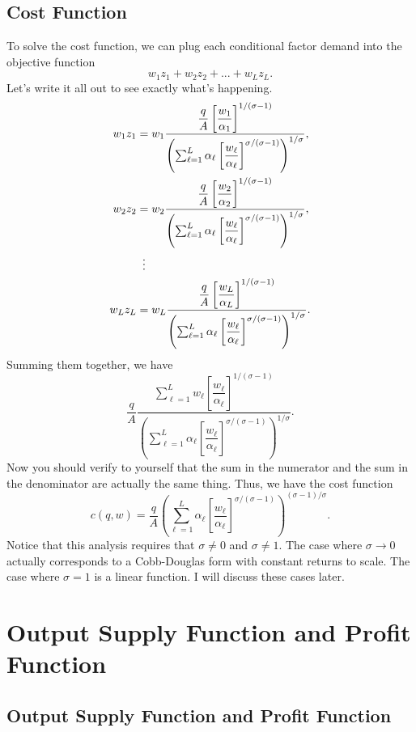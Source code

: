 \documentclass[12pt]{article}
\theoremstyle{definition}
\begin{document}
\subsection{Cost Function}
To solve the cost function, we can plug each conditional factor demand into the objective function
	\[	w_1z_1 + w_2 z_2 + ... + w_Lz_L.\]
Let's write it all out to see exactly what's happening.
\begin{align*}
		w_1z_1 & = w_1 \frac{ \dfrac{q}{A} \left[\dfrac{w_1}{\alpha_1}\right]^{1 / (\sigma - 1)} }{\left( \sum_{\ell=1}^L \alpha_{\ell} \left[ \dfrac{w_{\ell}}{\alpha_{\ell}} \right]^{\sigma / (\sigma - 1)} \right) ^{1 / \sigma}},\\
		w_2z_2 & = w_2 \frac{ \dfrac{q}{A} \left[\dfrac{w_2}{\alpha_2}\right]^{1 / (\sigma - 1)} }{\left( \sum_{\ell=1}^L \alpha_{\ell} \left[ \dfrac{w_{\ell}}{\alpha_{\ell}} \right]^{\sigma / (\sigma - 1)} \right) ^{1 / \sigma}},\\
			&\mathrel{\makebox[\widthof{=}]{\vdots}} \\
		w_Lz_L &= w_L \frac{\dfrac{q}{A} \left[\dfrac{w_L}{\alpha_L}\right]^{1 / (\sigma - 1)} }{\left( \sum_{\ell=1}^L \alpha_{\ell} \left[ \dfrac{w_{\ell}}{\alpha_{\ell}} \right]^{\sigma / (\sigma - 1)} \right) ^{1 / \sigma}}.
\end{align*}
Summing them together, we have
	\[ \frac{q}{A}  \frac{ \sum_{\ell=1}^L w_{\ell} \left[ \dfrac{w_{\ell}}{\alpha_{\ell}} \right]^{1 / (\sigma - 1)}}{\left( \sum_{\ell=1}^L \alpha_{\ell} \left[ \dfrac{w_{\ell}}{\alpha_{\ell}} \right]^{\sigma / (\sigma - 1)} \right) ^{1 / \sigma}}.\]
Now you should verify to yourself that the sum in the numerator and the sum in the denominator are actually the same thing. Thus, we have the cost function
	\[ c(q, w) = \frac{q}{A}  \left( \sum_{\ell=1}^L \alpha_{\ell} \left[ \frac{w_{\ell}}{\alpha_{\ell}} \right]^{\sigma / (\sigma - 1)} \right)^{(\sigma  - 1)/\sigma}.\]
Notice that this analysis requires that $\sigma \neq 0$ and $\sigma \neq 1$. The case where $\sigma \rightarrow 0$ actually corresponds to a Cobb-Douglas form  with constant returns to scale. The case where $\sigma=1$ is a linear function. I will discuss these cases later. 
	
	
	

\section{Output Supply Function and Profit Function}


\subsection{Output Supply Function and Profit Function}
\end{document}
